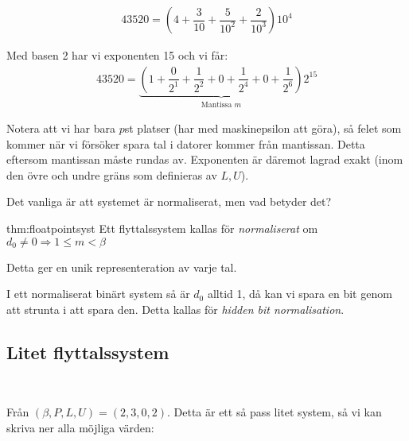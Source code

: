 \begin{equation*}
  \begin{gathered}
    43520 = \left(4+\dfrac{3}{10}+\dfrac{5}{10^2}+\dfrac{2}{10^3}\right)10^4
  \end{gathered}
\end{equation*}\par
\noindent Med basen 2 har vi exponenten 15 och vi får:
\begin{equation*}
  \begin{gathered}
    43520 = \underbrace{\left(1+\dfrac{0}{2^1}+\dfrac{1}{2^2}+0+\dfrac{1}{2^4}+0+\dfrac{1}{2^6}\right)}_{\text{Mantissa $m$}}2^{15}
  \end{gathered}
\end{equation*}
\par\bigskip
\noindent Notera att vi har bara $p$st platser (har med maskinepsilon att göra), så felet som kommer när vi försöker spara tal i datorer kommer från mantissan. Detta eftersom mantissan måste rundas av. Exponenten är däremot lagrad exakt (inom den övre och undre gräns som definieras av $L,U$).\par
\noindent Det vanliga är att systemet är normaliserat, men vad betyder det?
\par\bigskip
\begin{theo}{thm:floatpointsyst}
  Ett flyttalssystem kallas för \textit{normaliserat} om $d_0\neq0\Rightarrow 1\leq m<\beta$
\end{theo}
\par\bigskip
\noindent Detta ger en unik representeration av varje tal.\par
\noindent I ett normaliserat binärt system så är $d_0$ alltid 1, då kan vi spara en bit genom att strunta i att spara den. Detta kallas för \textit{hidden bit normalisation}.
\par\bigskip
\subsection{Litet flyttalssystem}\hfill\\
\par\bigskip
\noindent Från $(\beta,P,L,U) = (2,3,0,2)$. Detta är ett så pass litet system, så vi kan skriva ner alla möjliga värden:
\par\bigskip

